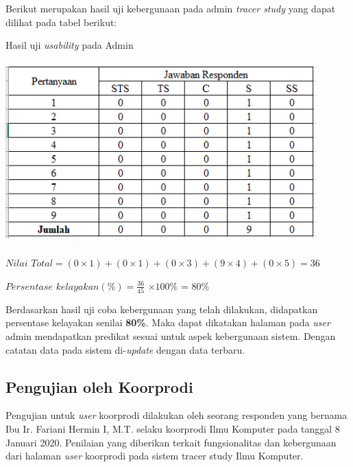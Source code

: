 \begin{enumerate}
	Berikut merupakan hasil uji kebergunaan pada admin \textit{tracer study} yang dapat dilihat pada tabel berikut:
	
	\begin{table}[H]
		\centering
		\caption{Hasil uji \textit{usability} pada Admin}
		\includegraphics[width=12cm,height=7cm]{gambar/UAT/hasil_u_admin}
		\label{h_u_admin}
	\end{table}
	
	$Nilai$ $Total = (0 \times 1) + (0 \times 1) + (0 \times 3) + (9 \times 4) + (0 \times 5) = 36$
	
	$Persentase$ $kelayakan (\%) = \frac{36}{45} $ $\times 100\%$ = 80\%
	
	Berdasarkan hasil uji coba kebergunaan yang telah dilakukan, didapatkan persentase kelayakan senilai \textbf{80\%}. Maka dapat dikatakan halaman pada \textit{user} admin mendapatkan predikat sesuai untuk aspek kebergunaan sistem. Dengan catatan data pada sistem di-\textit{update} dengan data terbaru.
	
\end{enumerate}

\subsection{Pengujian oleh Koorprodi}
Pengujian untuk \textit{user} koorprodi dilakukan oleh seorang responden yang bernama Ibu Ir. Fariani Hermin I, M.T. selaku koorprodi Ilmu Komputer pada tanggal 8 Januari 2020. Penilaian yang diberikan terkait fungsionalitas dan kebergunaan dari halaman \textit{user} koorprodi pada sistem tracer study Ilmu Komputer.


